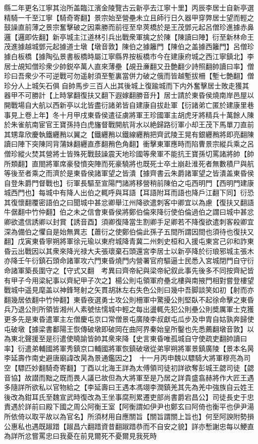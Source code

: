 縣二年更名江寧其治所盖臨江濱金陵覽古云新亭去江寧十里】丙辰李居士自新亭選精騎一千至江寧【騎奇寄翻】景宗始至營壘未立且師行日久器甲穿弊居士望而輕之鼓譟直前薄之景宗奮擊破之因乘勝而前徑至皁莢橋於是王茂鄧元起呂僧珍進據赤鼻邏【邏即佐翻】新亭城主江道林引兵出戰衆軍擒之於陳【陳讀曰陣】衍至新林命王茂進據越城鄧元起據道士墩【墩音敦】陳伯之據籬門【陳伯之盖據西籬門】呂僧珍據白板橋【據陶弘景書板橋時屬江寧縣界按板橋市今在建康府城之西江寧鎮北】李居士覘知僧珍衆少帥鋭卒萬人直來薄壘【覘丑亷翻又丑艶翻少詩照翻帥讀曰率】僧珍曰吾衆少不可逆戰可勿遥射須至塹裏當併力破之俄而皆越塹拔柵【塹七艶翻】僧珍分人上城矢石俱自帥馬步三百人出其後城上復踰城而下内外奮擊居士敗走獲其器甲不可勝計【上時掌翻復扶又翻下遐嫁翻勝音升】居士請於東昏侯燒南岸邑屋以開戰場自大航以西新亭以北皆盡衍諸弟皆自建康自拔赴軍【衍諸弟亡匿於建康里巷事見上卷上年】冬十月甲戌東昏侯遣征虜將軍王珍國軍主胡虎牙將精兵十萬餘人陳於朱雀航南宦官王寶孫持白虎旛督戰開航背水以絶歸路衍軍小却王茂下馬單刀直前其甥韋欣慶執鐵纒矟以翼之【鐵纒矟以鐵線纒矟把齊武陵王晃有銀纒矟將即亮翻陳讀曰陣下突陳同背蒲妹翻纒直彥翻矟色角翻】衝擊東軍應時而陷曹景宗縱兵乘之呂僧珍縱火焚其營將士皆殊死戰鼓譟震天地珍國等衆軍不能抗王寶孫切罵諸將帥【帥所類翻】直閤將軍席豪發憤突陣而死豪驍將也既死士卒土崩赴淮死者無數積尸與航等後至者乘之而濟於是東昏侯諸軍望之皆潰【據齊書云朱爵諸軍望之皆潰盖東昏侯自登朱爵門督戰也】衍軍長驅至宣陽門諸將移營稍前陳伯之屯西明門【西明門建康城西門也】每城中有降人出伯之輒呼與耳語【耳語附耳而語也降戶江翻下同】衍恐其復懷翻覆密語伯之曰聞城中甚忿卿舉江州降欲遣刺客中卿宜以為慮【復扶又翻語牛倨翻中竹仲翻】伯之未之信會東昏侯將鄭伯倫來降衍使伯倫過伯之謂曰城中甚忿卿欲遣信誘卿以封賞【誘音酉】須卿復降當生割卿手足卿若不降復欲遣刺客殺卿宜深為備伯之懼自是始無異志【蕭衍之使鄭伯倫此孫子五間所謂因間也須待也復扶又翻】戊寅東昏寧朔將軍徐元瑜以東府城降青冀二州刺史桓和入援屯東宮己卯和詐東昏云出戰因以其衆來降光禄大夫張瓌棄石頭還宮李居士以新亭降於衍琅邪城主張木亦降壬午衍鎮石頭命諸軍攻六門東昏燒門内營署官府驅逼士民悉入宮城閉門自守衍命諸軍築長圍守之【守式又翻　考異曰齊帝紀與梁帝紀叙此事先後多不同按齊紀皆有甲子今用梁紀事以齊紀甲子次之】楊公則屯領軍府壘北樓與南掖門相對嘗登樓望戰城中遥見麾盖以神鋒弩射之矢貫胡牀左右失色公則曰幾中吾脚談笑如初【射而亦翻幾居依翻中竹仲翻】東昏夜選勇士攻公則柵軍中驚擾公則堅臥不起徐命擊之東昏兵乃退公則所領皆湘州人素號怯懦城中輕之每出盪輒先犯公則壘公則奬厲軍士克獲更多先是東昏遣軍主左僧慶屯京口常僧景屯廣陵李叔獻屯瓜步及申胄自姑孰奔歸使屯破墩【據梁書鄱陽王恢傳破墩即破岡在曲阿界秦始皇所鑿也先悉薦翻墩音敦】以為東北聲援至是衍遣使曉諭皆帥其衆來降【史言東昏唯孤城自守使疏吏翻帥讀曰率】衍遣弟輔國將軍秀鎮京口輔國將軍恢鎮破墩從弟寧朔將軍景鎮廣陵【景本名昺李延壽作南史避唐廟諱改昺為景通鑑因之】　十一月丙申魏以驃騎大將軍穆亮為司空【驃匹妙翻騎奇寄翻】丁酉以北海王詳為太傅領司徒初詳欲奪彭城王勰司徒【勰音協】故譛而黜之既而畏人議已故但為大將軍至是乃居之詳貴盛翕赫將作大匠王遇多隨詳所欲私以官物給之【李延壽曰王遇本馮翊李潤鎮羌其先為羌中強族自云姓王後改為鉗耳氏至魏宣武時復改為王坐事腐刑累遷吏部尚書爵宕昌公】司徒長史于忠責遇於詳前曰殿下國之周公阿衡王室【阿衡謂如伊尹也鄭玄曰阿倚也衡平也伊尹湯所依倚以取平故以為官名】所須材用自應關旨【關旨謂關上旨也】何至阿諛附勢損公惠私也遇既踧踖【踧昌六翻踖資昔翻踧踖恭而不自安之貌】詳亦慙謝忠每以鯁直為詳所忿嘗罵忠曰我憂在前見爾死不憂爾見我死時